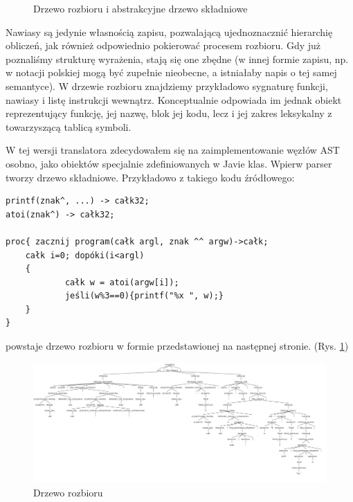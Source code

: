 \begin{figure}[h]
    \centering
    
    \caption{Drzewo rozbioru i abstrakcyjne drzewo składniowe}
\end{figure}

Nawiasy są jedynie własnością zapisu, pozwalającą ujednoznacznić hierarchię obliczeń, jak również odpowiednio pokierować procesem rozbioru. Gdy już poznaliśmy strukturę wyrażenia, stają się one zbędne (w innej formie zapisu, np. w notacji polskiej mogą być zupełnie nieobecne, a istniałaby napis o tej samej semantyce). W drzewie rozbioru znajdziemy przykładowo sygnaturę funkcji, nawiasy i listę instrukcji wewnątrz. Konceptualnie odpowiada im jednak obiekt reprezentujący funkcję, jej nazwę, blok jej kodu, lecz i jej zakres leksykalny z towarzyszącą tablicą symboli.

W tej wersji translatora zdecydowałem się na zaimplementowanie węzłów AST osobno, jako obiektów specjalnie zdefiniowanych w Javie klas. Wpierw parser tworzy drzewo składniowe. Przykładowo z takiego kodu źródłowego:

\begin{lstlisting}
printf(znak^, ...) -> całk32;
atoi(znak^) -> całk32;

proc{ zacznij program(całk argl, znak ^^ argw)->całk;
	całk i=0; dopóki(i<argl)
	{
    		całk w = atoi(argw[i]);
    		jeśli(w%3==0){printf("%x ", w);}
	}
}
\end{lstlisting}
powstaje drzewo rozbioru w formie przedstawionej na następnej stronie. (Rys. \ref{img_pt})

\begin{landscape}
\begin{figure}[p]
    \centering
        \includegraphics[width=\linewidth]{images/1.progmain/prezifelsePT1.png}
    \caption{Drzewo rozbioru}
    \label{img_pt}
\end{figure}
\end{landscape}

